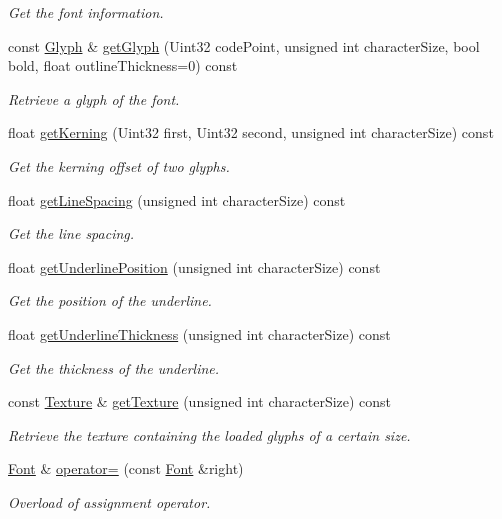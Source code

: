 \begin{DoxyCompactItemize}
\begin{DoxyCompactList}\small\item\em Get the font information. \end{DoxyCompactList}\item 
const \hyperlink{classsf_1_1_glyph}{Glyph} \& \hyperlink{classsf_1_1_font_a308876e51e75bb69844fa3926a214fbf}{get\+Glyph} (Uint32 code\+Point, unsigned int character\+Size, bool bold, float outline\+Thickness=0) const
\begin{DoxyCompactList}\small\item\em Retrieve a glyph of the font. \end{DoxyCompactList}\item 
float \hyperlink{classsf_1_1_font_a5e1d5aca772d4765ce940670c2f786a6}{get\+Kerning} (Uint32 first, Uint32 second, unsigned int character\+Size) const
\begin{DoxyCompactList}\small\item\em Get the kerning offset of two glyphs. \end{DoxyCompactList}\item 
float \hyperlink{classsf_1_1_font_a4538cc8af337393208a87675fe1c3e59}{get\+Line\+Spacing} (unsigned int character\+Size) const
\begin{DoxyCompactList}\small\item\em Get the line spacing. \end{DoxyCompactList}\item 
float \hyperlink{classsf_1_1_font_a726a55f40c19ac108e348b103190caad}{get\+Underline\+Position} (unsigned int character\+Size) const
\begin{DoxyCompactList}\small\item\em Get the position of the underline. \end{DoxyCompactList}\item 
float \hyperlink{classsf_1_1_font_ad6d0a5bc6c026fe85c239f1f822b54e6}{get\+Underline\+Thickness} (unsigned int character\+Size) const
\begin{DoxyCompactList}\small\item\em Get the thickness of the underline. \end{DoxyCompactList}\item 
const \hyperlink{classsf_1_1_texture}{Texture} \& \hyperlink{classsf_1_1_font_a15528d289f91cfd4b2597f8a9423e612}{get\+Texture} (unsigned int character\+Size) const
\begin{DoxyCompactList}\small\item\em Retrieve the texture containing the loaded glyphs of a certain size. \end{DoxyCompactList}\item 
\hyperlink{classsf_1_1_font}{Font} \& \hyperlink{classsf_1_1_font_a232515549846e3172a514d0b47918399}{operator=} (const \hyperlink{classsf_1_1_font}{Font} \&right)
\begin{DoxyCompactList}\small\item\em Overload of assignment operator. \end{DoxyCompactList}\end{DoxyCompactItemize}


